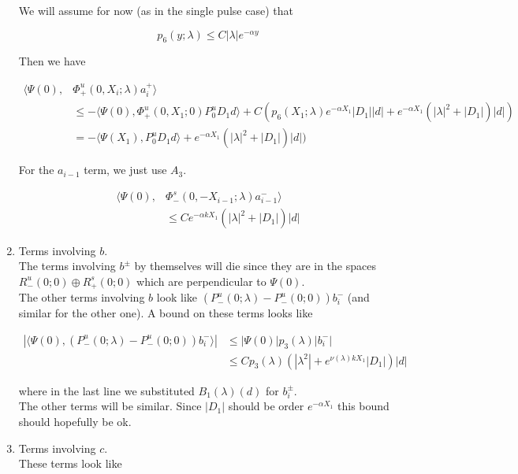 \documentclass[12pt]{article}
\begin{document}
\begin{enumerate}
We will assume for now (as in the single pulse case) that

\[
p_6(y; \lambda) \leq C |\lambda| e^{-\alpha y}
\]

Then we have

\begin{align*}
\langle \Psi(0), &\Phi^u_+(0, X_i; \lambda) a_i^+ \rangle \\
&\leq -\langle \Psi(0), \Phi^u_+(0, X_1; 0) P^u_0 D_1 d \rangle + C( p_6(X_1; \lambda) e^{-\alpha X_1}|D_1||d| + e^{-\alpha X_1} (|\lambda|^2 + |D_1|) |d|) \\
&= -\langle \Psi(X_1), P^u_0 D_1 d \rangle + e^{-\alpha X_1}( |\lambda|^2 + |D_1|)|d|)
\end{align*}

For the $a_{i-1}$ term, we just use $A_3$.

\begin{align*}
\langle \Psi(0), &\Phi^s_-(0, -X_{i-1}; \lambda)a_{i-1}^- \rangle \\
&\leq C e^{-\alpha k X_1} ( |\lambda|^2 + |D_1|) |d|
\end{align*}

\item Terms involving $b$.\\

The terms involving $b^\pm$ by themselves will die since they are in the spaces $R^u_-(0; 0) \oplus R^s_+(0; 0)$ which are perpendicular to $\Psi(0)$.\\

The other terms involving $b$ look like $(P^u_-(0; \lambda) - P^u_-(0; 0))b_i^-$ (and similar for the other one). A bound on these terms looks like

\begin{align*}
|\langle \Psi(0), (P^u_-(0; \lambda) - P^u_-(0; 0))b_i^- \rangle|
&\leq |\Psi(0)| p_3(\lambda)|b_i^-| \\
&\leq C p_3(\lambda) (|\lambda^2| + e^{\nu(\lambda)k X_1}|D_1|)|d|
\end{align*}

where in the last line we substituted $B_1(\lambda)(d)$ for $b_i^\pm$.\\

The other terms will be similar. Since $|D_1|$ should be order $e^{-\alpha X_1}$ this bound should hopefully be ok.

\item Terms involving $c$.\\

These terms look like


\end{enumerate}
\end{document}
